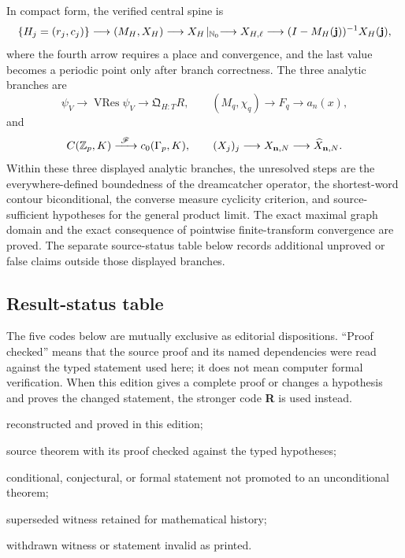 In compact form, the verified central spine is
\[
 \{H_j=(r_j,c_j)\}
 \longrightarrow (M_H,X_H)
 \longrightarrow X_H\!\mid_{\mathbb N_0}
 \longrightarrow X_{H,\ell}
 \longrightarrow (I-M_H(\mathbf j))^{-1}X_H(\mathbf j),
\]
where the fourth arrow requires a place and convergence, and the last value
becomes a periodic point only after branch correctness.  The three analytic
branches are
\[
 \psi_V\longrightarrow\operatorname{VRes}\psi_V
 \longrightarrow\mathfrak Q_{H:T}R,
 \qquad
 (M_q,\chi_q)\longrightarrow F_q\longrightarrow a_n(x),
\]
and
\[
 C(\Z_p,K)\xrightarrow{\ \mathscr F\ }c_0(\Gamma_p,K),
 \qquad
 (X_j)_j\longrightarrow X_{\mathbf n,N}\longrightarrow
 \widehat X_{\mathbf n,N}.
\]
Within these three displayed analytic branches, the unresolved steps are the
everywhere-defined boundedness of the dreamcatcher operator, the
shortest-word contour biconditional, the converse measure cyclicity criterion,
and source-sufficient hypotheses for the general product limit.  The exact
maximal graph domain and the exact consequence of pointwise finite-transform
convergence are proved.  The separate source-status table below records
additional unproved or false claims outside those displayed branches.

\subsection{Result-status table}

The five codes below are mutually exclusive as editorial dispositions.
``Proof checked'' means that the source proof and its named dependencies were
read against the typed statement used here; it does not mean computer formal
verification.  When this edition gives a complete proof or changes a
hypothesis and proves the changed statement, the stronger code
\textbf{R} is used instead.

\begin{description}[leftmargin=2.8em,labelwidth=1.8em,style=multiline]
\item[\textbf{R}] reconstructed and proved in this edition;
\item[\textbf{S}] source theorem with its proof checked against the typed
      hypotheses;
\item[\textbf{C}] conditional, conjectural, or formal statement not promoted
      to an unconditional theorem;
\item[\textbf{U}] superseded witness retained for mathematical history;
\item[\textbf{W}] withdrawn witness or statement invalid as printed.
\end{description}

